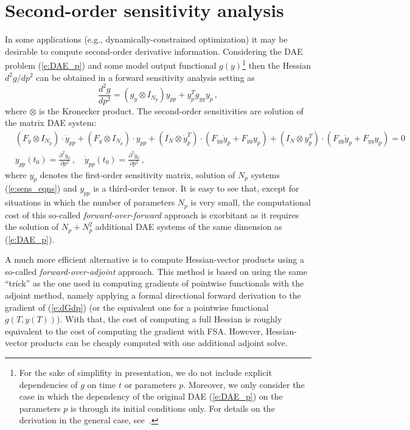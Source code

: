 \section{Second-order sensitivity analysis}\label{ss:hess_sensi}
In some applications (e.g., dynamically-constrained optimization) it may
be desirable to compute second-order derivative information. Considering 
the DAE problem (\ref{e:DAE_p}) and some model output functional 
$g(y)$\footnote{For the sake of simplifity in presentation, we do not 
include explicit dependencies of $g$ on time $t$ or parameters $p$.
Moreover, we only consider the case in which the dependency of the 
original DAE (\ref{e:DAE_p}) on the parameters $p$ is through its initial conditions only.
For details on the derivation in the general case, see~\cite{OzBa:05}.}
then the Hessian $d^2g/dp^2$ can be obtained in a forward sensitivity
analysis setting as
\begin{equation*}
\frac{d^2 g}{d p^2} = \left(g_y \otimes I_{N_p} \right ) y_{pp} + y_p^T g_{yy} y_p \, ,
\end{equation*}
where $\otimes$ is the Kronecker product. The second-order sensitivities are
solution of the matrix DAE system:
\begin{equation*}
  \begin{split}
  & \left( F_{\dot y} \otimes I_{N_p} \right) \cdot \dot y_{pp}  +
  \left( F_y        \otimes I_{N_p} \right) \cdot y_{pp}       +
  \left( I_N \otimes {\dot y}_p^T \right) \cdot \left( F_{\dot y \dot y} \dot y_p + F_{y \dot y} y_p \right) +
  \left( I_N \otimes y_p^T        \right) \cdot \left( F_{y \dot y}      \dot y_p + F_{y y}      y_p \right) = 0 \\
  & y_{pp}(t_0) = \frac{\partial^2 y_0}{\partial p^2} \, , \quad 
  \dot y_{pp}(t_0) = \frac{\partial^2 \dot y_0}{\partial p^2} \, ,
  \end{split}
\end{equation*}
where $y_p$ denotes the first-order sensitivity matrix, solution of $N_p$ 
systems (\ref{e:sens_eqns}) and $y_{pp}$ is a third-order tensor.
It is easy to see that, except for situations in which the number of parameters
$N_p$ is very small, the computational cost of this so-called {\em forward-over-forward} 
approach is exorbitant as it requires the solution of $N_p + N_p^2$ additional
DAE systems of the same dimension as (\ref{e:DAE_p}).

A much more efficient alternative is to compute Hessian-vector products using
a so-called {\em forward-over-adjoint} approach. This method is based on using
the same ``trick'' as the one used in computing gradients of pointwise
functionals with the adjoint method, namely applying a formal directional forward 
derivation to the gradient of (\ref{e:dGdp}) (or the equivalent one for a pointwise 
functional $g(T, y(T))$). With that, the cost of computing a full Hessian is roughly 
equivalent to the cost of computing the  gradient with FSA.
However, Hessian-vector products can be cheaply computed with one additional adjoint solve.

